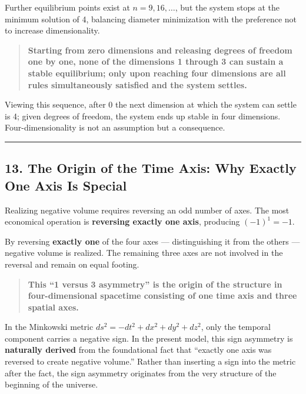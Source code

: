 \documentclass[a4paper,11pt]{article}
\theoremstyle{definition}
\begin{document}
Further equilibrium points exist at \(n = 9, 16, \ldots\), but the
system stops at the minimum solution of 4, balancing diameter
minimization with the preference not to increase dimensionality.

\begin{quote}
\textbf{Starting from zero dimensions and releasing degrees of freedom
one by one, none of the dimensions 1 through 3 can sustain a stable
equilibrium; only upon reaching four dimensions are all rules
simultaneously satisfied and the system settles.}
\end{quote}

Viewing this sequence, after 0 the next dimension at which the system
can settle is 4; given degrees of freedom, the system ends up stable in
four dimensions. Four-dimensionality is not an assumption but a
consequence.

\begin{center}\rule{0.5\linewidth}{0.5pt}\end{center}

\subsection{13. The Origin of the Time Axis: Why Exactly One Axis Is
Special}\label{the-origin-of-the-time-axis-why-exactly-one-axis-is-special}

Realizing negative volume requires reversing an odd number of axes. The
most economical operation is \textbf{reversing exactly one axis},
producing \((-1)^1 = -1\).

By reversing \textbf{exactly one} of the four axes --- distinguishing it
from the others --- negative volume is realized. The remaining three
axes are not involved in the reversal and remain on equal footing.

\begin{quote}
\textbf{This ``1 versus 3 asymmetry'' is the origin of the structure in
four-dimensional spacetime consisting of one time axis and three spatial
axes.}
\end{quote}

In the Minkowski metric \(ds^2 = -dt^2 + dx^2 + dy^2 + dz^2\), only the
temporal component carries a negative sign. In the present model, this
sign asymmetry is \textbf{naturally derived} from the foundational fact
that ``exactly one axis was reversed to create negative volume.'' Rather
than inserting a sign into the metric after the fact, the sign asymmetry
originates from the very structure of the beginning of the universe.
\end{document}
